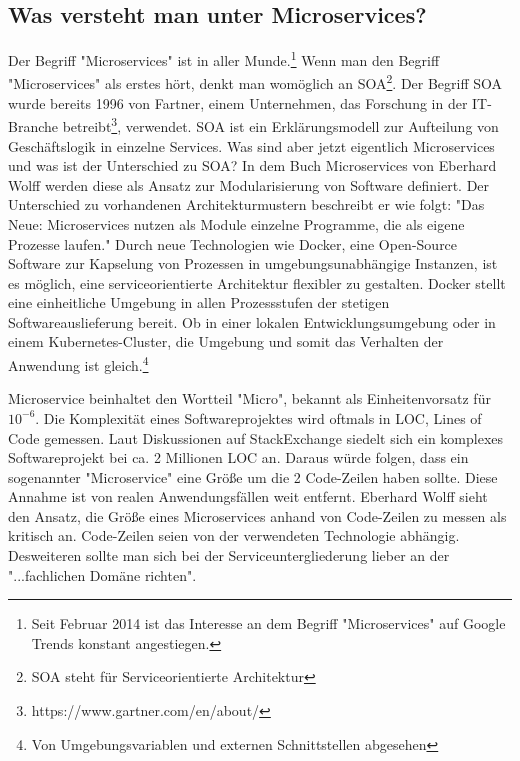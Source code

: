 \subsection{Was versteht man unter Microservices?}
\label{subsec:wasverstehtmanuntermicroservices}
Der Begriff "Microservices" ist in aller Munde.\footnote{Seit Februar 2014 ist das Interesse an dem Begriff "Microservices" auf Google Trends konstant angestiegen.\cite{MicroservicesGoogleTrends}}
Wenn man den Begriff "Microservices" als erstes hört, denkt man womöglich an SOA\footnote{SOA steht für Serviceorientierte Architektur}.
Der Begriff SOA wurde bereits 1996 von Fartner, einem Unternehmen, das Forschung in der IT-Branche
betreibt\footnote{https://www.gartner.com/en/about/}, verwendet\cite{GartnerSOAPart1}.
SOA ist ein Erklärungsmodell zur Aufteilung von Geschäftslogik in einzelne Services.
Was sind aber jetzt eigentlich Microservices und was ist der Unterschied zu SOA?
In dem Buch Microservices von Eberhard Wolff werden diese als Ansatz zur Modularisierung
von Software definiert. Der Unterschied zu vorhandenen Architekturmustern beschreibt er wie folgt:
"Das Neue: Microservices nutzen als Module einzelne Programme, die als eigene Prozesse laufen."\cite[S. 2]{MicroservicesBook}
Durch neue Technologien wie Docker, eine Open-Source Software zur Kapselung von Prozessen in umgebungsunabhängige Instanzen,\cite{DockerOverview}
ist es möglich, eine serviceorientierte Architektur flexibler zu gestalten. Docker stellt eine einheitliche Umgebung in
allen Prozessstufen der stetigen Softwareauslieferung bereit. Ob in einer lokalen Entwicklungsumgebung oder in einem
Kubernetes-Cluster, die Umgebung und somit das Verhalten der Anwendung ist gleich.\footnote{Von Umgebungsvariablen und externen Schnittstellen abgesehen}

Microservice beinhaltet den Wortteil "Micro", bekannt als Einheitenvorsatz für \(10^{-6}\). Die Komplexität eines Softwareprojektes
wird oftmals in LOC, Lines of Code gemessen. Laut Diskussionen auf StackExchange siedelt sich ein komplexes Softwareprojekt bei
ca. 2 Millionen LOC an.\cite{ProjectsizeStackexchange} Daraus würde folgen, dass ein sogenannter "Microservice" eine Größe um die
2 Code-Zeilen haben sollte. Diese Annahme ist von realen Anwendungsfällen weit entfernt. Eberhard Wolff sieht den Ansatz,
die Größe eines Microservices anhand von Code-Zeilen zu messen als kritisch an. Code-Zeilen seien von der verwendeten
Technologie abhängig. Desweiteren sollte man sich bei der Serviceuntergliederung lieber an der "...fachlichen Domäne richten".\cite[S. 31 und 32]{MicroservicesBook}

